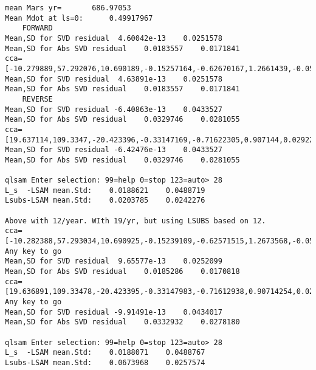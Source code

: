 \documentclass[draft]{article}
\begin{document}
\begin{verbatim}
mean Mars yr=       686.97053
Mean Mdot at ls=0:      0.49917967
    FORWARD
Mean,SD for SVD residual  4.60042e-13    0.0251578
Mean,SD for Abs SVD residual    0.0183557    0.0171841
cca=[-10.279889,57.292076,10.690189,-0.15257164,-0.62670167,1.2661439,-0.050841373,-0.40489779]
Mean,SD for SVD residual  4.63891e-13    0.0251578
Mean,SD for Abs SVD residual    0.0183557    0.0171841
    REVERSE
Mean,SD for SVD residual -6.40863e-13    0.0433527
Mean,SD for Abs SVD residual    0.0329746    0.0281055
cca=[19.637114,109.3347,-20.423396,-0.33147169,-0.71622305,0.907144,0.029221461,-1.0022922]
Mean,SD for SVD residual -6.42476e-13    0.0433527
Mean,SD for Abs SVD residual    0.0329746    0.0281055

qlsam Enter selection: 99=help 0=stop 123=auto> 28
L_s  -LSAM mean.Std:    0.0188621    0.0488719
Lsubs-LSAM mean.Std:    0.0203785    0.0242276

Above with 12/year. WIth 19/yr, but using LSUBS based on 12. 
cca=[-10.282388,57.293034,10.690925,-0.15239109,-0.62571515,1.2673568,-0.050011825,-0.41772512]
Any key to go
Mean,SD for SVD residual  9.65577e-13    0.0252099
Mean,SD for Abs SVD residual    0.0185286    0.0170818
cca=[19.636891,109.33478,-20.423395,-0.33147983,-0.71612938,0.90714254,0.029221834,-0.99989311]
Any key to go
Mean,SD for SVD residual -9.91491e-13    0.0434017
Mean,SD for Abs SVD residual    0.0332932    0.0278180

qlsam Enter selection: 99=help 0=stop 123=auto> 28
L_s  -LSAM mean.Std:    0.0188071    0.0488767
Lsubs-LSAM mean.Std:    0.0673968    0.0257574
\end{verbatim}
\end{document}

